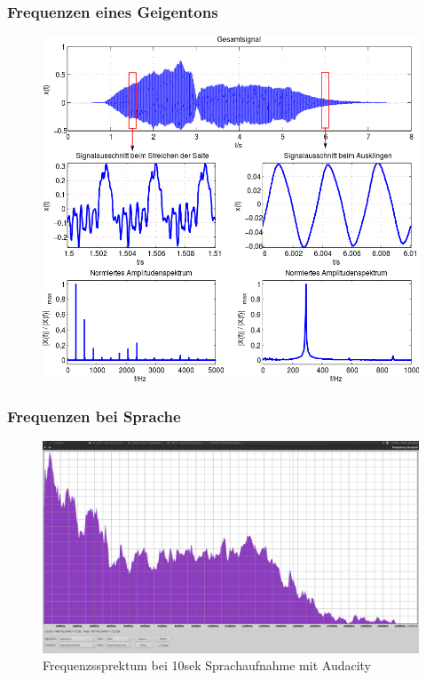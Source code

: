 \begin{frame}
  \frametitle{Frequenzen eines Geigentons}
  \begin{center}
    \begin{figure}
      \includegraphics[height=0.75\textheight,width=\textwidth,keepaspectratio]{e14/geigenton.png}
    \end{figure}
  \end{center}
\end{frame}

\begin{frame}
  \frametitle{Frequenzen bei Sprache}
  \begin{center}
    \begin{figure}
      \includegraphics[height=0.75\textheight,width=\textwidth,keepaspectratio]{e14/spracheFrequenzen.png}
      \caption{Frequenzssprektum bei 10sek Sprachaufnahme mit Audacity}
    \end{figure}
  \end{center}
\end{frame}

